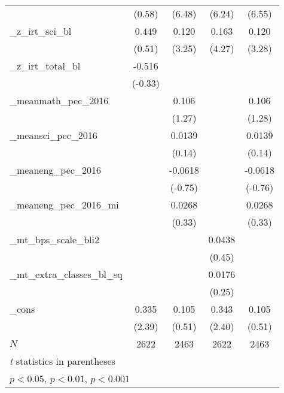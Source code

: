 {\begin{tabular}{l*{4}{c}}
            &      (0.58)         &      (6.48)         &      (6.24)         &      (6.55)         \\
[1em]
\_z\_irt\_sci\_bl&       0.449         &       0.120\sym{**} &       0.163\sym{***}&       0.120\sym{**} \\
            &      (0.51)         &      (3.25)         &      (4.27)         &      (3.28)         \\
[1em]
\_z\_irt\_total\_bl&      -0.516         &                     &                     &                     \\
            &     (-0.33)         &                     &                     &                     \\
[1em]
\_meanmath\_pec\_2016&                     &       0.106         &                     &       0.106         \\
            &                     &      (1.27)         &                     &      (1.28)         \\
[1em]
\_meansci\_pec\_2016&                     &      0.0139         &                     &      0.0139         \\
            &                     &      (0.14)         &                     &      (0.14)         \\
[1em]
\_meaneng\_pec\_2016&                     &     -0.0618         &                     &     -0.0618         \\
            &                     &     (-0.75)         &                     &     (-0.76)         \\
[1em]
\_meaneng\_pec\_2016\_mi&                     &      0.0268         &                     &      0.0268         \\
            &                     &      (0.33)         &                     &      (0.33)         \\
[1em]
\_mt\_bps\_scale\_bli2&                     &                     &      0.0438         &                     \\
            &                     &                     &      (0.45)         &                     \\
[1em]
\_mt\_extra\_classes\_bl\_sq&                     &                     &      0.0176         &                     \\
            &                     &                     &      (0.25)         &                     \\
[1em]
\_cons      &       0.335\sym{*}  &       0.105         &       0.343\sym{*}  &       0.105         \\
            &      (2.39)         &      (0.51)         &      (2.40)         &      (0.51)         \\
\hline
\(N\)       &        2622         &        2463         &        2622         &        2463         \\
\hline\hline
\multicolumn{5}{l}{\footnotesize \textit{t} statistics in parentheses}\\
\multicolumn{5}{l}{\footnotesize \sym{*} \(p<0.05\), \sym{**} \(p<0.01\), \sym{***} \(p<0.001\)}\\
\end{tabular}
}
